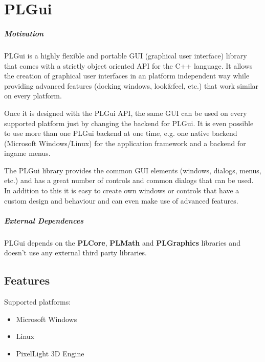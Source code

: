 \chapter{PLGui}


\paragraph{Motivation}
PLGui is a highly flexible and portable GUI (graphical user interface) library that comes with a strictly object oriented API for the C++ language. It allows the creation of graphical user interfaces in an platform independent way while providing advanced features (docking windows, look\&feel, etc.) that work similar on every platform.

Once it is designed with the PLGui API, the same GUI can be used on every supported platform just by changing the backend for PLGui. It is even possible to use more than one PLGui backend at one time, e.g. one native backend (Microsoft Windows/Linux) for the application framework and a backend for ingame menus.

The PLGui library provides the common GUI elements (windows, dialogs, menus, etc.) and has a great number of controls and common dialogs that can be used. In addition to this it is easy to create own windows or controls that have a custom design and behaviour and can even make use of advanced features.


\paragraph{External Dependences}
PLGui depends on the \textbf{PLCore}, \textbf{PLMath} and \textbf{PLGraphics} libraries and doesn't use any external third party libraries.




\section{Features}
Supported platforms:
\begin{itemize}
\item Microsoft Windows
\item Linux
\item PixelLight 3D Engine
\end{itemize}
